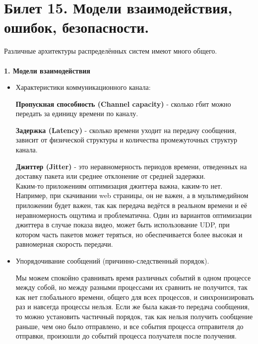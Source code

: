 \newpage
\section {Билет 15. Модели взаимодействия, ошибок, безопасности.}

Различные архитектуры распределённых систем имеют много общего.\\
\\
\textbf{1. Модели взаимодействия}
\begin{itemize}
\item Характеристики коммуникационного канала:

\hspace{-6px}\textbf{Пропускная способность (Channel capacity)} - сколько гбит можно передать за единицу времени по каналу.

\hspace{-6px}\textbf{Задержка (Latency)} - сколько времени уходит на передачу сообщения, зависит от физической структуры и количества промежуточных структур канала.

\hspace{-6px}\textbf{Джиттер (Jitter)}  - это неравномерность периодов времени, отведенных на доставку пакета или среднее отклонение от средней задержки. \\
Каким-то приложениям оптимизация джиттера важна, каким-то нет. Например, при скачивании web страницы, он не важен, а в мультимедийном приложении будет важен, так как передача ведётся в реальном времени и её неравномерность ощутима и проблематична. Один из вариантов оптимизации джиттера в случае показа видео, может быть использование UDP, при котором часть пакетов может теряться, но обеспечивается более высокая и равномерная скорость передачи.

\item Упорядочивание сообщений (причинно-следственный порядок).

Мы можем спокойно сравнивать время различных событий в одном процессе между собой, но между разными процессами их сравнить не получится, так как нет глобального времени, общего для всех процессов, и синхронизировать раз и навсегда процессы нельзя. Если же была какая-то передача сообщения, то можно установить частичный порядок, так как нельзя получить сообщение раньше, чем оно было отправлено, и все события процесса отправителя до отправки, произошли до событий процесса получателя после получения.

\newpage


\end{itemize}
